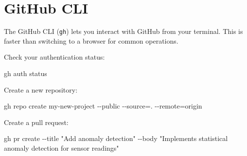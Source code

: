 \documentclass[
  letterpaper,
  DIV=11,
  numbers=noendperiod]{scrreprt}
\newenvironment{Shaded}{\begin{snugshade}}{\end{snugshade}}
\newcommand{\AttributeTok}[1]{\textcolor[rgb]{0.40,0.45,0.13}{#1}}
\newcommand{\ExtensionTok}[1]{\textcolor[rgb]{0.00,0.23,0.31}{#1}}
\newcommand{\NormalTok}[1]{\textcolor[rgb]{0.00,0.23,0.31}{#1}}
\newcommand{\OperatorTok}[1]{\textcolor[rgb]{0.37,0.37,0.37}{#1}}
\newcommand{\StringTok}[1]{\textcolor[rgb]{0.13,0.47,0.30}{#1}}
\begin{document}
\section{GitHub CLI}\label{github-cli}

The GitHub CLI (\texttt{gh}) lets you interact with GitHub from your
terminal. This is faster than switching to a browser for common
operations.

Check your authentication status:

\begin{codelisting}

\caption{\texttt{terminal}}

\begin{Shaded}
\begin{Highlighting}[]
\ExtensionTok{gh}\NormalTok{ auth status}
\end{Highlighting}
\end{Shaded}

\end{codelisting}

Create a new repository:

\begin{codelisting}

\caption{\texttt{terminal}}

\begin{Shaded}
\begin{Highlighting}[]
\ExtensionTok{gh}\NormalTok{ repo create my{-}new{-}project }\AttributeTok{{-}{-}public} \AttributeTok{{-}{-}source}\OperatorTok{=}\NormalTok{. }\AttributeTok{{-}{-}remote}\OperatorTok{=}\NormalTok{origin}
\end{Highlighting}
\end{Shaded}

\end{codelisting}

Create a pull request:

\begin{codelisting}

\caption{\texttt{terminal}}

\begin{Shaded}
\begin{Highlighting}[]
\ExtensionTok{gh}\NormalTok{ pr create }\AttributeTok{{-}{-}title} \StringTok{"Add anomaly detection"} \AttributeTok{{-}{-}body} \StringTok{"Implements statistical anomaly detection for sensor readings"}
\end{Highlighting}
\end{Shaded}

\end{codelisting}
\end{document}
